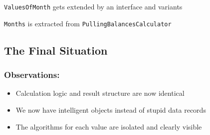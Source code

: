 \documentclass[a4paper,fleqn,titlepage,11pt]{article}
\begin{document}
\texttt{ValuesOfMonth} gets extended by an interface and variants

\texttt{Months} is extracted from \texttt{PullingBalancesCalculator}

\subsection*{The Final Situation}

\subsubsection*{Observations:}

\begin{itemize}
\item Calculation logic and result structure are now identical
\item We now have intelligent objects instead of stupid data records
\item The algorithms for each value are isolated and clearly visible
\end{itemize}
\end{document}
